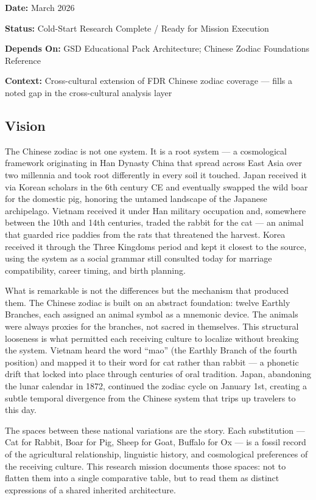 \documentclass[11pt,letterpaper]{article}
\newcommand{\metafield}[2]{\textbf{\sffamily #1} #2\par}
\begin{document}
\metafield{Date:}{March 2026}
\metafield{Status:}{Cold-Start Research Complete / Ready for Mission Execution}
\metafield{Depends On:}{GSD Educational Pack Architecture; Chinese Zodiac Foundations Reference}
\metafield{Context:}{Cross-cultural extension of FDR Chinese zodiac coverage --- fills a noted gap in the cross-cultural analysis layer}

\subsection{Vision}

The Chinese zodiac is not one system. It is a root system --- a cosmological framework originating in Han Dynasty China that spread across East Asia over two millennia and took root differently in every soil it touched. Japan received it via Korean scholars in the 6th century CE and eventually swapped the wild boar for the domestic pig, honoring the untamed landscape of the Japanese archipelago. Vietnam received it under Han military occupation and, somewhere between the 10th and 14th centuries, traded the rabbit for the cat --- an animal that guarded rice paddies from the rats that threatened the harvest. Korea received it through the Three Kingdoms period and kept it closest to the source, using the system as a social grammar still consulted today for marriage compatibility, career timing, and birth planning.

What is remarkable is not the differences but the mechanism that produced them. The Chinese zodiac is built on an abstract foundation: twelve Earthly Branches, each assigned an animal symbol as a mnemonic device. The animals were always proxies for the branches, not sacred in themselves. This structural looseness is what permitted each receiving culture to localize without breaking the system. Vietnam heard the word ``mao'' (the Earthly Branch of the fourth position) and mapped it to their word for cat rather than rabbit --- a phonetic drift that locked into place through centuries of oral tradition. Japan, abandoning the lunar calendar in 1872, continued the zodiac cycle on January 1st, creating a subtle temporal divergence from the Chinese system that trips up travelers to this day.

The spaces between these national variations are the story. Each substitution --- Cat for Rabbit, Boar for Pig, Sheep for Goat, Buffalo for Ox --- is a fossil record of the agricultural relationship, linguistic history, and cosmological preferences of the receiving culture. This research mission documents those spaces: not to flatten them into a single comparative table, but to read them as distinct expressions of a shared inherited architecture.
\end{document}
